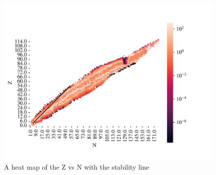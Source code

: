 \documentclass[12pt, a4paper]{article}
\begin{document}
\begin{figure}[H]
    \centering
    \includegraphics[width = \textwidth]{3Plot3.png}
    \caption{A heat map of the Z vs N with the stability line}
\end{figure}
\end{document}
